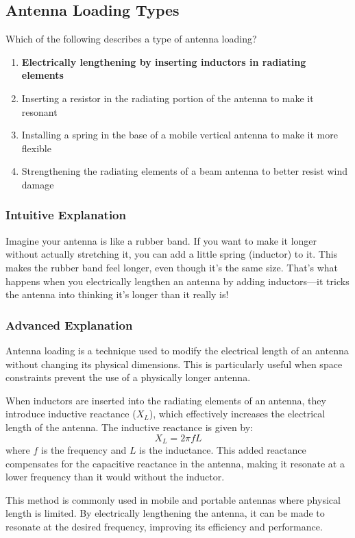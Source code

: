 \subsection{Antenna Loading Types}
\label{T9A02}

\begin{tcolorbox}[colback=gray!10!white,colframe=black!75!black,title=T9A02]
Which of the following describes a type of antenna loading?
\begin{enumerate}[label=\Alph*)]
    \item \textbf{Electrically lengthening by inserting inductors in radiating elements}
    \item Inserting a resistor in the radiating portion of the antenna to make it resonant
    \item Installing a spring in the base of a mobile vertical antenna to make it more flexible
    \item Strengthening the radiating elements of a beam antenna to better resist wind damage
\end{enumerate}
\end{tcolorbox}

\subsubsection{Intuitive Explanation}
Imagine your antenna is like a rubber band. If you want to make it longer without actually stretching it, you can add a little spring (inductor) to it. This makes the rubber band feel longer, even though it’s the same size. That’s what happens when you electrically lengthen an antenna by adding inductors—it tricks the antenna into thinking it’s longer than it really is!

\subsubsection{Advanced Explanation}
Antenna loading is a technique used to modify the electrical length of an antenna without changing its physical dimensions. This is particularly useful when space constraints prevent the use of a physically longer antenna. 

When inductors are inserted into the radiating elements of an antenna, they introduce inductive reactance (\(X_L\)), which effectively increases the electrical length of the antenna. The inductive reactance is given by:
\[
X_L = 2\pi f L
\]
where \(f\) is the frequency and \(L\) is the inductance. This added reactance compensates for the capacitive reactance in the antenna, making it resonate at a lower frequency than it would without the inductor.

This method is commonly used in mobile and portable antennas where physical length is limited. By electrically lengthening the antenna, it can be made to resonate at the desired frequency, improving its efficiency and performance.

